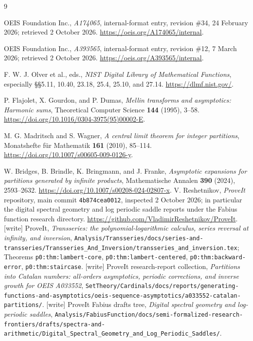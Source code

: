 \documentclass[11pt,letterpaper]{article}
\numberwithin{equation}{section}
\theoremstyle{remark}\newtheorem{remark}[theorem]{Remark}
\begin{document}
\begin{thebibliography}{9}\raggedright
{}
OEIS Foundation Inc., \emph{A174065}, internal-format entry, revision \#34, 24 February 2026; retrieved 2 October 2026.
\url{https://oeis.org/A174065/internal}.

OEIS Foundation Inc., \emph{A393565}, internal-format entry, revision \#12, 7 March 2026; retrieved 2 October 2026.
\url{https://oeis.org/A393565/internal}.

F. W. J. Olver et al., eds., \emph{NIST Digital Library of Mathematical Functions}, especially \S\S5.11, 10.40, 23.18, 25.4, 25.10, and 27.14.
\url{https://dlmf.nist.gov/}.

P. Flajolet, X. Gourdon, and P. Dumas,
\emph{Mellin transforms and asymptotics: Harmonic sums},
Theoretical Computer Science \textbf{144} (1995), 3--58.
\url{https://doi.org/10.1016/0304-3975(95)00002-E}.

M. G. Madritsch and S. Wagner,
\emph{A central limit theorem for integer partitions},
Monatshefte f\"ur Mathematik \textbf{161} (2010), 85--114.
\url{https://doi.org/10.1007/s00605-009-0126-y}.

W. Bridges, B. Brindle, K. Bringmann, and J. Franke,
\emph{Asymptotic expansions for partitions generated by infinite products},
Mathematische Annalen \textbf{390} (2024), 2593--2632.
\url{https://doi.org/10.1007/s00208-024-02807-x}.
V. Reshetnikov, \emph{ProveIt} repository, main commit
\texttt{4b874cea0012}, inspected 2 October 2026; in particular the digital spectral geometry and log periodic saddle reports under the Fabius function research directory.
\url{https://github.com/VladimirReshetnikov/ProveIt}.
[write] ProveIt, \emph{Transseries: the polynomial-logarithmic calculus, series reversal at infinity, and inversion},
\texttt{Analysis/\allowbreak Transseries/\allowbreak docs/\allowbreak series-and-transseries/\allowbreak Transseries\_And\_Inversion/\allowbreak transseries\_and\_inversion.tex};
Theorems \texttt{p0:thm:lambert-core}, \texttt{p0:thm:lambert-centered}, \texttt{p0:thm:backward-error}, \texttt{p0:thm:staircase}.
[write] ProveIt research-report collection, \emph{Partitions into Catalan numbers: all-orders asymptotics, periodic corrections, and inverse growth for OEIS A033552},
\texttt{SetTheory/\allowbreak Cardinals/\allowbreak docs/\allowbreak reports/\allowbreak generating-functions-and-asymptotics/\allowbreak oeis-sequence-asymptotics/\allowbreak a033552-catalan-partitions/}.
[write] ProveIt Fabius drafts tree, \emph{Digital spectral geometry and log-periodic saddles},
\texttt{Analysis/\allowbreak FabiusFunction/\allowbreak docs/\allowbreak semi-formalized-research-frontiers/\allowbreak drafts/\allowbreak spectra-and-arithmetic/\allowbreak Digital\_Spectral\_Geometry\_and\_Log\_Periodic\_Saddles/}.
\end{thebibliography}
\end{document}
